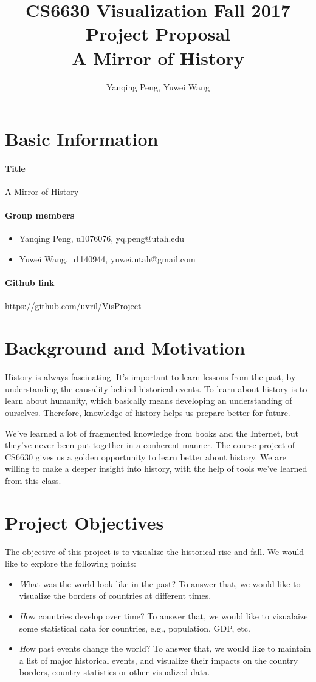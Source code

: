 \documentclass[12pt, fullpage,letterpaper]{article}
\title{CS6630 Visualization Fall 2017 Project Proposal\\ A Mirror of History}
\author{Yanqing Peng, Yuwei Wang}
\begin{document}
\maketitle

\section{Basic Information}
\paragraph{Title} A Mirror of History
\paragraph{Group members}
\begin{itemize}
    \item Yanqing Peng, u1076076, yq.peng@utah.edu
    \item Yuwei Wang, u1140944, yuwei.utah@gmail.com
\end{itemize}
\paragraph{Github link} https://github.com/uvril/VisProject

\section{Background and Motivation}

History is always fascinating.
It's important to learn lessons from the past, by understanding the causality behind historical events.
To learn about history is to learn about humanity, which basically means
developing an understanding of ourselves.
Therefore, knowledge of history helps us prepare better for future.

We've learned a lot of fragmented
knowledge from books and the Internet, but they've never been
put together in a conherent manner.
The course project of CS6630 gives us a golden opportunity to
learn better about history.
We are willing to make a deeper
insight into history, with the help of tools we've learned from this class.

\section{Project Objectives}
The objective of this project is to visualize the historical rise and fall.
We would like to explore the following points:
\begin{itemize}
    \item {\emph What was the world look like in the past?} To answer that, we would like to visualize the borders of countries at different times.
    \item {\emph How countries develop over time?} To answer that, we would like to visualaize some statistical data for countries, e.g., population, GDP, etc.
    \item {\emph How past events change the world?} To answer that, we would like to maintain a list of major historical events, and visualize their impacts on the country borders, country statistics or other visualized data.
\end{itemize}
\end{document}
